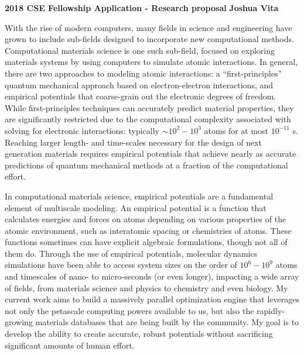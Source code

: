 \documentclass[11pt]{article}
\begin{document}
\begin{center}
    \textbf{2018 CSE Fellowship Application - Research proposal}
\hfill
\textbf{Joshua Vita}
\end{center}
\noindent\hrulefill

\bigskip

With the rise of modern computers, many fields in science and engineering have grown to include sub-fields designed to incorporate new computational methods. Computational materials science is one such sub-field, focused on exploring materials systems by using computers to simulate atomic interactions. In general, there are two approaches to modeling atomic interactions: a ``first-principles'' quantum mechanical approach based on electron-electron interactions, and empirical potentials that coarse-grain out the electronic degrees of freedom. While first-principles techniques can accurately predict material properties, they are significantly restricted due to the computational complexity associated with solving for electronic interactions: typically $\sim10^2-10^3$ atoms for at most $10^{-11}$ s. Reaching larger length- and time-scales necessary for the design of next generation materials requires empirical potentials that achieve nearly as accurate predictions of quantum mechanical methods at a fraction of the computational effort.


In computational materials science, empirical potentials are a fundamental element of multiscale modeling. An empirical potential is a function that calculates energies and forces on atoms depending on various properties of the atomic environment, such as interatomic spacing or chemistries of atoms. These functions sometimes can have explicit algebraic formulations, though not all of them do. Through the use of empirical potentials, molecular dynamics simulations have been able to access system sizes on the order of $10^6-10^9$ atoms and timescales of nano- to micro-seconds (or even longer), impacting a wide array of fields, from materials science and physics to chemistry and even biology. My current work aims to build a massively parallel optimization engine that leverages not only the petascale computing powers available to us, but also the rapidly-growing materials databases that are being built by the community. My goal is to develop the ability to create accurate, robust potentials without sacrificing significant amounts of human effort.
\end{document}
